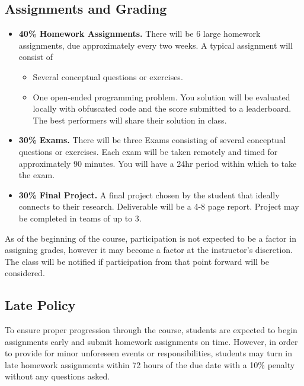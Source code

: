 \documentclass[9pt]{article}
\begin{document}
\begin{samepage}
\section*{Assignments and Grading}

\begin{itemize}[noitemsep]
    \item \textbf{40\% Homework Assignments.}
There will be 6 large homework assignments, due approximately every two weeks. A typical assignment will consist of
\begin{itemize}[nosep]
    \item Several conceptual questions or exercises.
    \item One open-ended programming problem. You solution will be evaluated locally with obfuscated code and the score submitted to a leaderboard. The best performers will share their solution in class.
\end{itemize}

\item \textbf{30\% Exams.}
There will be three Exams consisting of several conceptual questions or exercises. Each exam will be taken remotely and timed for approximately 90 minutes. You will have a 24hr period within which to take the exam.

\item \textbf{30\% Final Project.}
A final project chosen by the student that ideally connects to their research. Deliverable will be a 4-8 page report. Project may be completed in teams of up to 3.
\end{itemize}
As of the beginning of the course, participation is not expected to be a factor in assigning grades, however it may become a factor at the instructor's discretion. The class will be notified if participation from that point forward will be considered.
\end{samepage}

\subsection*{Late Policy}

To ensure proper progression through the course, students are expected to begin assignments early and submit homework assignments on time. However, in order to provide for minor unforeseen events or responsibilities, students may turn in late homework assignments within 72 hours of the due date with a 10\% penalty without any questions asked.
\end{document}
